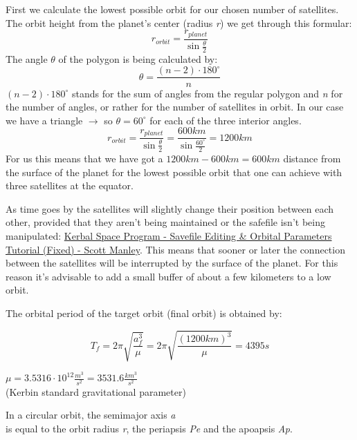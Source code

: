 \documentclass[12pt,paper=A4,numbers=noenddot,bibliography=totoc,listof=totoc,DIV=11,BCOR=1mm]{scrreprt}
\begin{document}
First we calculate the lowest possible orbit for our chosen number of satellites.
The orbit height from the planet's center (radius \emph{r}) we get through this formular:
\begin{equation}
r_{orbit} = \frac{r_{planet}}{\sin \frac{\theta}{2}}
\end{equation}
The angle $\theta$ of the polygon is being calculated by:
\begin{equation}
\theta = \frac{(n-2) \cdot 180^{\circ}}{n}
\end{equation}
$(n-2) \cdot 180^{\circ}$ stands for the sum of angles from the regular polygon and
\emph{n} for the number of angles, or rather for the number of satellites in orbit.
In our case we have a triangle $\rightarrow$ so $\theta = 60^{\circ}$ for each of the three interior angles.
$$
r_{orbit} = \frac{r_{planet}}{\sin \frac{\theta}{2}} = \frac{600km}{\sin \frac{60^\circ}{2}} = 1200km
$$
For us this means that we have got a $1200km - 600km = 600km$ distance from the surface of the planet for the lowest possible orbit that one can achieve with three satellites at the equator.

As time goes by the satellites will slightly change their position between each other, provided that they aren't being maintained or the safefile isn't being manipulated: \href{https://youtu.be/0wXVm3M2I2w}{Kerbal Space Program - Savefile Editing \& Orbital Parameters Tutorial (Fixed) - Scott Manley}.
This means that sooner or later the connection between the satellites will be interrupted by the surface of the planet. For this reason it's advisable to add a small buffer of about a few kilometers to a low orbit.


\medskip The orbital period of the target orbit (final orbit) is obtained by:

\begin{equation}
T_{f} = 2\pi \sqrt{\frac{a_{f}^{3}}{\mu}} = 2\pi \sqrt{\frac{(1200km)^{3}}{\mu}} = 4395s
\end{equation}

\begin{flushright}
$\mu = 3.5316 \cdot 10^{12} \frac{m^{3}}{s^{2}} = 3531.6 \frac{km^{3}}{s^{2}}$ \\
(Kerbin standard gravitational parameter)
\end{flushright}
\begin{flushright}
In a circular orbit, the semimajor axis \emph{a}\\ is equal to the orbit radius \emph{r}, the periapsis \emph{Pe} and the apoapsis \emph{Ap}.
\end{flushright}
\end{document}
